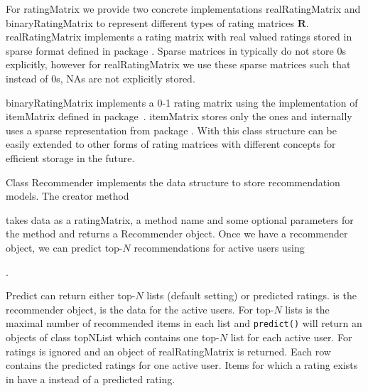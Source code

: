 \documentclass[nojss]{jss}
\newcommand{\class}[1]{\mbox{\textsf{#1}}}
\newcommand{\func}[1]{\mbox{\texttt{#1()}}}
\newcommand{\mat}[1]{{\mathbf{#1}}}
\begin{document}
For \class{ratingMatrix} we provide two concrete
implementations \class{realRatingMatrix} and
\class{binaryRatingMatrix} to represent different types of rating
matrices $\mat{R}$.
\class{realRatingMatrix} implements a rating matrix with real valued
ratings stored in sparse format defined in package .
Sparse matrices in  typically do not store 0s explicitly,
however for \class{realRatingMatrix} we use these sparse matrices
such that instead of 0s, NAs are not explicitly stored.

\class{binaryRatingMatrix} implements a 0-1 rating matrix using the
implementation of \class{itemMatrix} defined in package~.
\class{itemMatrix} stores only the ones and internally uses a sparse
representation from package .  With this class structure
 can be easily extended to other forms of rating matrices
with different concepts for efficient storage in the future.

Class \class{Recommender} implements the data structure to store recommendation
models. The creator method

\begin{center}
\end{center}

takes data as a \class{ratingMatrix},
a method name and some optional parameters for the method and
returns a \class{Recommender} object. Once we have a recommender object,
we can predict top-$N$ recommendations for active users using

\begin{center}
.

\end{center}

Predict can return either top-$N$ lists (default setting) or predicted ratings.
 is the recommender
object,  is the data for the active users.
For top-$N$ lists  is
the maximal number of recommended items in each list and \func{predict} will
return an objects of class \class{topNList} which contains
one top-$N$ list for each active user. For ratings  is ignored
and an object of \class{realRatingMatrix} is returned. Each row
contains the predicted ratings for one active user. Items for which a
rating exists in  have a  instead of a
predicted rating.
\end{document}
